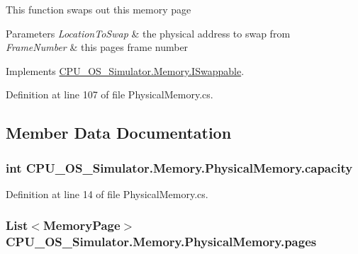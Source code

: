 This function swaps out this memory page 


\begin{DoxyParams}{Parameters}
{\em Location\+To\+Swap} & the physical address to swap from\\
\hline
{\em Frame\+Number} & this page\textquotesingle{}s frame number\\
\hline
\end{DoxyParams}


Implements \hyperlink{interface_c_p_u___o_s___simulator_1_1_memory_1_1_i_swappable_ae789e9deb0600d48b0dcbe4a4252220a}{C\+P\+U\+\_\+\+O\+S\+\_\+\+Simulator.\+Memory.\+I\+Swappable}.



Definition at line 107 of file Physical\+Memory.\+cs.



\subsection{Member Data Documentation}
\hypertarget{class_c_p_u___o_s___simulator_1_1_memory_1_1_physical_memory_aefbb5641a06c37aa17bb523d8c90dc60}{}
\subsubsection[{capacity}]{\setlength{\rightskip}{0pt plus 5cm}int C\+P\+U\+\_\+\+O\+S\+\_\+\+Simulator.\+Memory.\+Physical\+Memory.\+capacity\hspace{0.3cm}{\ttfamily [private]}}\label{class_c_p_u___o_s___simulator_1_1_memory_1_1_physical_memory_aefbb5641a06c37aa17bb523d8c90dc60}


Definition at line 14 of file Physical\+Memory.\+cs.

\hypertarget{class_c_p_u___o_s___simulator_1_1_memory_1_1_physical_memory_aaf32bdc314ba84ea7e120fb28e3a3e67}{}
\subsubsection[{pages}]{\setlength{\rightskip}{0pt plus 5cm}List$<${\bf Memory\+Page}$>$ C\+P\+U\+\_\+\+O\+S\+\_\+\+Simulator.\+Memory.\+Physical\+Memory.\+pages\hspace{0.3cm}{\ttfamily [private]}}\label{class_c_p_u___o_s___simulator_1_1_memory_1_1_physical_memory_aaf32bdc314ba84ea7e120fb28e3a3e67}


